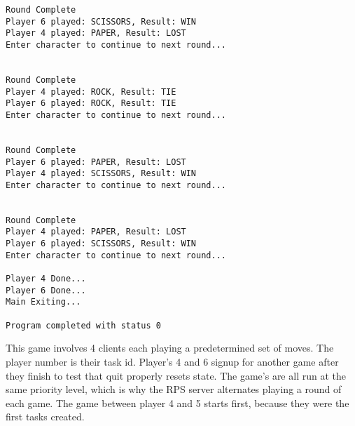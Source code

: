 \documentclass[letterpaper]{article}
\begin{document}
\begin{verbatim}
Round Complete
Player 6 played: SCISSORS, Result: WIN
Player 4 played: PAPER, Result: LOST
Enter character to continue to next round...


Round Complete
Player 4 played: ROCK, Result: TIE
Player 6 played: ROCK, Result: TIE
Enter character to continue to next round...


Round Complete
Player 6 played: PAPER, Result: LOST
Player 4 played: SCISSORS, Result: WIN
Enter character to continue to next round...


Round Complete
Player 4 played: PAPER, Result: LOST
Player 6 played: SCISSORS, Result: WIN
Enter character to continue to next round...

Player 4 Done...
Player 6 Done...
Main Exiting... 

Program completed with status 0

\end{verbatim}

This game involves 4 clients each playing a predetermined set of moves. The player number is their task id. Player's 4 and 6 signup for another game after they finish to test that quit properly resets state. The game's are all run at the same priority level, which is why the RPS server alternates playing a round of each game. The game between player 4 and 5 starts first, because they were the first tasks created. 
\end{document}
